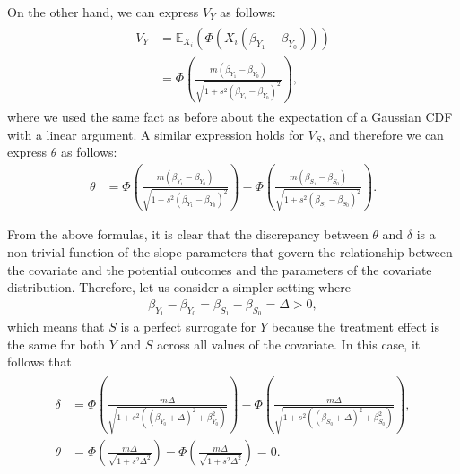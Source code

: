 \documentclass[12pt]{article}
\newcommand{\E}{\mathbb{E}}
\begin{document}
On the other hand, we can express \(V_{Y}\) as follows:
\begin{align}
  \begin{split}
    V_{Y} & = \E_{X_{i}} \left( \Phi \left( X_{i} (\beta_{Y_{1}} - \beta_{Y_{0}}) \right) \right) \\
    & = \Phi \left( \frac{m (\beta_{Y_{1}} - \beta_{Y_{0}})}{\sqrt{1 + s^2 (\beta_{Y_{1}} - \beta_{Y_{0}})^2}} \right),
  \end{split}
\end{align}
where we used the same fact as before about the expectation of a Gaussian CDF with a linear argument. A similar expression holds for \(V_{S}\), and therefore we can express \(\theta\) as follows:
\begin{align}
  \theta & = \Phi \left( \frac{m (\beta_{Y_{1}} - \beta_{Y_{0}})}{\sqrt{1 + s^2 (\beta_{Y_{1}} - \beta_{Y_{0}})^2}} \right) - \Phi \left( \frac{m (\beta_{S_{1}} - \beta_{S_{0}})}{\sqrt{1 + s^2 (\beta_{S_{1}} - \beta_{S_{0}})^2}} \right).
\end{align}

From the above formulas, it is clear that the discrepancy between \(\theta\) and \(\delta\) is a non-trivial function of the slope parameters that govern the relationship between the covariate and the potential outcomes and the parameters of the covariate distribution. Therefore, let us consider a simpler setting where
\begin{align}
    \beta_{Y_{1}} - \beta_{Y_{0}} = \beta_{S_{1}} - \beta_{S_{0}} = \Delta > 0,
\end{align}
which means that \(S\) is a perfect surrogate for \(Y\) because the treatment effect is the same for both \(Y\) and \(S\) across all values of the covariate. In this case, it follows that
\begin{align}
  \begin{split}
    \delta & = \Phi \left( \frac{m \Delta}{\sqrt{1 + s^2 ( (\beta_{Y_{0}} + \Delta)^2 + \beta_{Y_{0}}^2 )}} \right) - \Phi \left( \frac{m \Delta}{\sqrt{1 + s^2 ( (\beta_{S_{0}} + \Delta)^2 + \beta_{S_{0}}^2 )}} \right), \\
    \theta & = \Phi \left( \frac{m \Delta}{\sqrt{1 + s^2 \Delta^2}} \right) - \Phi \left( \frac{m \Delta}{\sqrt{1 + s^2 \Delta^2}} \right) = 0.
  \end{split}
\end{align}
\end{document}
